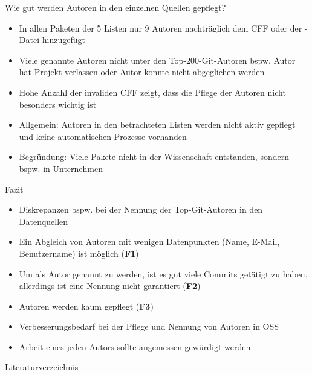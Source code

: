 \documentclass[%
    handout,
    aspectratio=1610,
    10pt,
    onlytextwidth, %
]{beamer}
\begin{document}
\begin{frame}{Wie gut werden Autoren in den einzelnen Quellen gepflegt?}
    \begin{itemize}
        \item In allen Paketen der 5 Listen nur 9 Autoren nachträglich dem CFF oder der -Datei hinzugefügt
        \item Viele genannte Autoren nicht unter den Top-200-Git-Autoren bspw. Autor hat Projekt verlassen oder Autor konnte nicht abgeglichen werden
        \item Hohe Anzahl der invaliden CFF zeigt, dass die Pflege der Autoren nicht besonders wichtig ist
        \item Allgemein: Autoren in den betrachteten Listen werden nicht aktiv gepflegt und keine automatischen Prozesse vorhanden
        \item Begründung: Viele Pakete nicht in der Wissenschaft entstanden, sondern bspw. in Unternehmen %
    \end{itemize}
\end{frame}

\begin{frame}{Fazit}
    \begin{itemize}
        \item Diskrepanzen bspw. bei der Nennung der Top-Git-Autoren in den Datenquellen
        \item Ein Abgleich von Autoren mit wenigen Datenpunkten (Name, E-Mail, Benutzername) ist möglich (\textcolor{links}{\textbf{F1}})
        \item Um als Autor genannt zu werden, ist es gut viele Commits getätigt zu haben, allerdings ist eine Nennung nicht garantiert (\textcolor{links}{\textbf{F2}})
        \item Autoren werden kaum gepflegt (\textcolor{links}{\textbf{F3}})
        \item Verbesserungsbedarf bei der Pflege und Nennung von Autoren in OSS
        \item Arbeit eines jeden Autors sollte angemessen gewürdigt werden
    \end{itemize}
\end{frame}

\begin{frame}{Literaturverzeichnis}
    \printbibliography
\end{frame}

\end{document}
